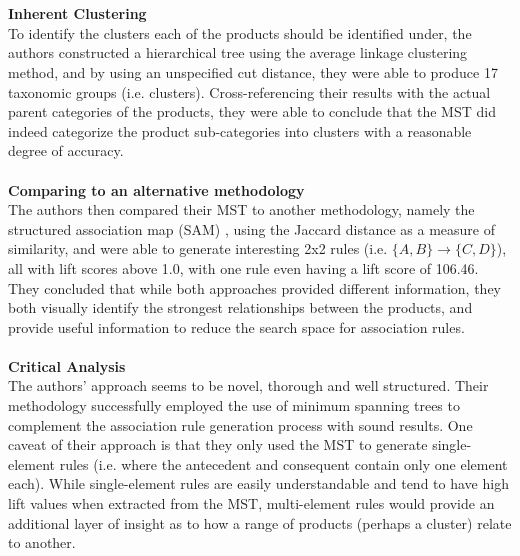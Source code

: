 \\\\\textbf{Inherent Clustering}\\
To identify the clusters each of the products should be identified under, the authors constructed a hierarchical tree using the average linkage clustering method, and by using an unspecified cut distance, they were able to produce 17 taxonomic groups (i.e. clusters). Cross-referencing their results with the actual parent categories of the products, they were able to conclude that the MST did indeed categorize the product sub-categories into clusters with a reasonable degree of accuracy.
\\\\\textbf{Comparing to an alternative methodology}\\
The authors then compared their MST to another methodology, namely the structured association map (SAM) , using the Jaccard distance as a measure of similarity,  and were able to generate interesting 2x2 rules (i.e. $\{A,B\}\rightarrow\{C, D\}$), all with lift scores above 1.0, with one rule even having a lift score of 106.46. They concluded that while both approaches provided different information, they both visually identify the strongest relationships between the products, and provide useful information to reduce the search space for association rules.
\\\\\textbf{Critical Analysis}\\
The authors' approach seems to be novel,  thorough and well structured.  Their methodology successfully employed the use of minimum spanning trees to complement the association rule generation process with sound results.  One caveat of their approach is that they only used the MST to generate single-element rules (i.e. where the antecedent and consequent contain only one element each).  While single-element rules are easily understandable and tend to have high lift values when extracted from the MST, multi-element rules would provide an additional layer of insight as to how a range of products (perhaps a cluster) relate to another.


